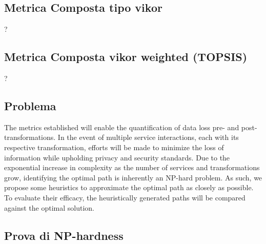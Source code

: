 \subsection{Metrica Composta tipo vikor}
?
\subsection{Metrica Composta vikor weighted (TOPSIS)}
?

\subsection{Problema}
The metrics established will enable the quantification of data loss pre- and post-transformations.
In the event of multiple service interactions, each with its respective transformation, efforts will be made to minimize the loss of information while upholding privacy and security standards.
Due to the exponential increase in complexity as the number of services and transformations grow, identifying the optimal path is inherently an NP-hard problem.
As such, we propose some heuristics to approximate the optimal path as closely as possible. To evaluate their efficacy, the heuristically generated paths will be compared against the optimal solution.
\subsection{Prova di NP-hardness}


